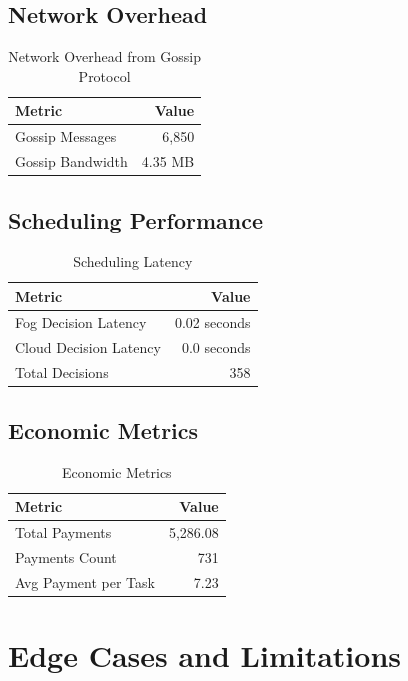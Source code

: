 \documentclass[12pt,a4paper]{article}
\begin{document}
\subsection{Network Overhead}

\begin{table}[h]
\centering
\begin{tabular}{@{}lr@{}}
\toprule
\textbf{Metric} & \textbf{Value} \\ \midrule
Gossip Messages & 6,850 \\
Gossip Bandwidth & 4.35 MB \\ \bottomrule
\end{tabular}
\caption{Network Overhead from Gossip Protocol}
\end{table}

\subsection{Scheduling Performance}

\begin{table}[h]
\centering
\begin{tabular}{@{}lr@{}}
\toprule
\textbf{Metric} & \textbf{Value} \\ \midrule
Fog Decision Latency & 0.02 seconds \\
Cloud Decision Latency & 0.0 seconds \\
Total Decisions & 358 \\ \bottomrule
\end{tabular}
\caption{Scheduling Latency}
\end{table}

\subsection{Economic Metrics}

\begin{table}[h]
\centering
\begin{tabular}{@{}lr@{}}
\toprule
\textbf{Metric} & \textbf{Value} \\ \midrule
Total Payments & 5,286.08 \\
Payments Count & 731 \\
Avg Payment per Task & 7.23 \\ \bottomrule
\end{tabular}
\caption{Economic Metrics}
\end{table}

\section{Edge Cases and Limitations}
\end{document}
